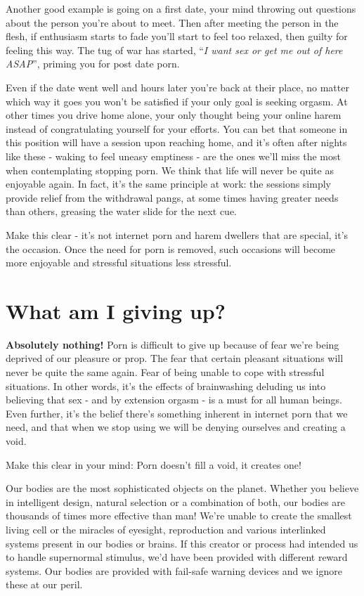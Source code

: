 \documentclass[
]{book}
\begin{document}
Another good example is going on a first date, your mind throwing out questions about the person you're about to meet. Then after meeting the person in the flesh, if enthusiasm starts to fade you'll start to feel too relaxed, then guilty for feeling this way. The tug of war has started, ``\emph{I want sex or get me out of here ASAP}'', priming you for post date porn.

Even if the date went well and hours later you're back at their place, no matter which way it goes you won't be satisfied if your only goal is seeking orgasm. At other times you drive home alone, your only thought being your online harem instead of congratulating yourself for your efforts. You can bet that someone in this position will have a session upon reaching home, and it's often after nights like these - waking to feel uneasy emptiness - are the ones we'll miss the most when contemplating stopping porn. We think that life will never be quite as enjoyable again. In fact, it's the same principle at work: the sessions simply provide relief from the withdrawal pangs, at some times having greater needs than others, greasing the water slide for the next cue.

Make this clear - it's not internet porn and harem dwellers that are special, it's the occasion. Once the need for porn is removed, such occasions will become more enjoyable and stressful situations less stressful.

\hypertarget{what-am-i-giving-up}{%
\chapter{What am I giving up?}\label{what-am-i-giving-up}}

\textbf{Absolutely nothing!} Porn is difficult to give up because of fear we're being deprived of our pleasure or prop. The fear that certain pleasant situations will never be quite the same again. Fear of being unable to cope with stressful situations. In other words, it's the effects of brainwashing deluding us into believing that sex - and by extension orgasm - is a must for all human beings. Even further, it's the belief there's something inherent in internet porn that we need, and that when we stop using we will be denying ourselves and creating a void.

Make this clear in your mind: Porn doesn't fill a void, it creates one!

Our bodies are the most sophisticated objects on the planet. Whether you believe in intelligent design, natural selection or a combination of both, our bodies are thousands of times more effective than man! We're unable to create the smallest living cell or the miracles of eyesight, reproduction and various interlinked systems present in our bodies or brains. If this creator or process had intended us to handle supernormal stimulus, we'd have been provided with different reward systems. Our bodies are provided with fail-safe warning devices and we ignore these at our peril.
\end{document}

